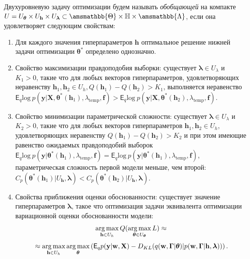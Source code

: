 \begin{defin}
Двухуровневую задачу оптимизации будем называть \textit{обобщающей} на компакте $U = U_{\boldsymbol{\theta}} \times U_{\mathbf{h}} \times U_{\boldsymbol{\lambda}} \subset \amsmathbb{\Theta} \times \mathbb{H} \times \amsmathbb{\Lambda}$, если она удовлетворяет следующим свойствам:
\begin{enumerate}
\item Для каждого значения гиперпараметров $\mathbf{h}$ оптимальное решение нижней задачи оптимизации $\boldsymbol{\theta}^{*}$ определено однозначно.

\item Свойство максимизации правдоподобия выборки: существует $\boldsymbol{\lambda} \in U_{\lambda}$ и  $K_1>0$, такие что для любых векторов гиперпараметров, удовлетворяющих неравенству $\mathbf{h}_1, \mathbf{h}_2 \in  U_{h}, Q(\mathbf{h}_1) - Q(\mathbf{h}_2) > K_1$, выполняется неравенство $\mathsf{E}_q \text{log}~p(\mathbf{y}|\mathbf{X}, \boldsymbol{\theta}^{*}(\mathbf{h}_1), \lambda_{\text{temp}}, \mathbf{f})>\mathsf{E}_q \text{log}~p(\mathbf{y}|\mathbf{X}, \boldsymbol{\theta}^{*}(\mathbf{h}_2), \lambda_{\text{temp}}, \mathbf{f})$.

\item Свойство минимизации параметрической сложности:  существует  $\boldsymbol{\lambda} \in U_{\lambda}$ и $K_2>0$, такие что для любых векторов гиперпараметров $\mathbf{h}_1, \mathbf{h}_2 \in U_h$, удовлетворяющих неравенству $Q(\mathbf{h}_1) - Q(\mathbf{h}_2) > K_2$ и при этом имеющие равенство ожидаемых правдоподобий выборок  $\mathsf{E}_q \text{log}~p(\mathbf{y}|\boldsymbol{\theta}^{*}(\mathbf{h}_1), \lambda_{\text{temp}}, \mathbf{f}) = \mathsf{E}_q \text{log}~p(\mathbf{y}|\boldsymbol{\theta}^{*}(\mathbf{h}_1), \lambda_{\text{temp}}, \mathbf{f})$, параметрическая сложность первой модели меньше, чем второй: $C_p(\boldsymbol{\theta}^{*}(\mathbf{h}_1)|U_\mathbf{h},\boldsymbol{\lambda})<C_p(\boldsymbol{\theta}^{*}(\mathbf{h}_2)|U_\mathbf{h},\boldsymbol{\lambda})$.

\item Свойства приближения оценки обоснованности: существует значение гиперпараметров $\boldsymbol{\lambda}$, такое что оптимизация задачи эквивалента оптимизации вариационной оценки обоснованности модели: $$\operatorname*{arg\,max}_{\mathbf{h} \in U_h}Q(\operatorname*{arg\,max}_{\boldsymbol{\theta} \in U_{\boldsymbol{\theta}}} L) \approx $$
\[
 \approx \operatorname*{arg\,max}_{\mathbf{h} \in U_h}\operatorname*{arg\,max}_{\boldsymbol{\theta}} \left(\mathsf{E}_q p(\mathbf{y}|\mathbf{w}, \mathbf{X}) - {D}_{KL}(q(\mathbf{w}, \boldsymbol{\Gamma}|\boldsymbol{\theta})|p(\mathbf{w}, \boldsymbol{\Gamma}|\mathbf{h}, \boldsymbol{\lambda}))\right).
\]


\end{enumerate}
\end{defin}
